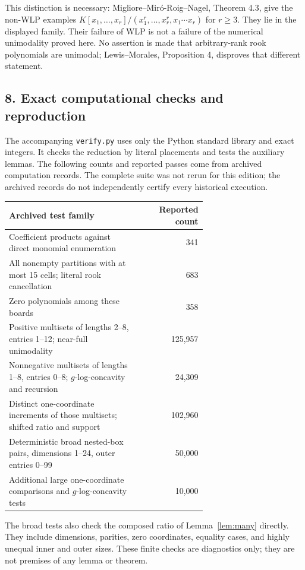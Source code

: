 \documentclass[11pt]{article}
\begin{document}
This distinction is necessary: Migliore--Mir\'o-Roig--Nagel, Theorem 4.3,
give the non-WLP examples
$K[x_1,\ldots,x_r]/(x_1^r,\ldots,x_r^r,x_1\cdots x_r)$ for $r\ge3$.
They lie in the displayed family. Their failure of WLP is not a failure
of the numerical unimodality proved here. No assertion is made that
arbitrary-rank rook polynomials are unimodal; Lewis--Morales,
Proposition 4, disproves that different statement.

\subsection*{8. Exact computational checks and reproduction}
The accompanying \texttt{verify.py} uses only the Python standard
library and exact integers. It checks the reduction by literal placements
and tests the auxiliary lemmas. The following counts and reported passes
come from archived computation records. The complete suite was not rerun
for this edition; the archived records do not independently certify every
historical execution.
\begin{center}
\begin{tabular}{@{}p{0.66\linewidth}r@{}}
\toprule
Archived test family & Reported count\\
\midrule
Coefficient products against direct monomial enumeration & 341\\
All nonempty partitions with at most 15 cells; literal rook cancellation & 683\\
Zero polynomials among these boards & 358\\
Positive multisets of lengths 2--8, entries 1--12; near-full unimodality & 125,957\\
Nonnegative multisets of lengths 1--8, entries 0--8; $g$-log-concavity and recursion & 24,309\\
Distinct one-coordinate increments of those multisets; shifted ratio and support & 102,960\\
Deterministic broad nested-box pairs, dimensions 1--24, outer entries 0--99 & 50,000\\
Additional large one-coordinate comparisons and $g$-log-concavity tests & 10,000\\
\bottomrule
\end{tabular}
\end{center}
The broad tests also check the composed ratio of
Lemma~\ref{lem:many} directly. They include dimensions, parities, zero
coordinates, equality cases, and highly unequal inner and outer sizes.
These finite checks are diagnostics only; they are not premises of any
lemma or theorem.
\end{document}
